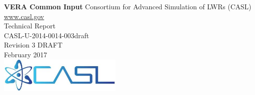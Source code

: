 %
%
%

\begin{titlepage}
    \centering
    \vfill
    {\bfseries\LARGE
        VERA Common Input}
        \vskip4cm
    {\Large
        Consortium for Advanced Simulation of LWRs (CASL) \\
        \href{http://www.casl.gov}{www.casl.gov} \\
        \vskip1cm
        Technical Report \\
        CASL-U-2014-0014-003draft  \\
        \vskip1cm
        Revision 3 DRAFT \\
        February 2017 \\
    }
    \vfill
    \vfill
    \includegraphics[width=6cm]{figs/casl_sm.jpg}
    \vfill
\end{titlepage}
